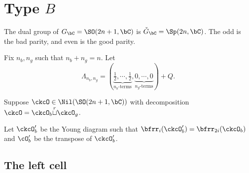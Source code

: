 \documentclass[12pt,a4paper]{amsart}
\newcommand{\sgn}{\operatorname{sgn}}
\numberwithin{equation}{section}
\theoremstyle{remark}
\def\half{{\tfrac{1}{2}}}
\def\ckGc{\check{G}_{\bC}}
\def\Gc{G_\bC}
\def\cuprow{{\stackrel{r}{\sqcup}}}
\def\tsgn{\widetilde{\sgn}}
\begin{document}






\section{Type $B$}

  The dual group of $\Gc = \SO(2n+1,\bC)$ is $\ckGc = \Sp(2n,\bC)$. The odd is
  the bad parity, and even is the good parity.


  Fix $n_{b},n_{g}$ such that $n_{b}+ n_{g} = n$. Let
  \begin{equation} \label{eq:Lam.C}
    \Lambda_{n_{b},n_{g}} = (\underbrace{\half, \cdots, \half}_{n_{b}\text{-terms}}, \underbrace{0, \cdots, 0}_{n_{g}\text{-terms}}) + Q.
  \end{equation}

  Suppose $\ckcO\in \Nil(\SO(2n+1,\bC))$ with decomposition
  $\ckcO = \ckcO_{b}\cuprow \ckcO_{g}$.

  Let $\ckcO'_b$ be the Young diagram such that
  $\bfrr_i(\ckcO'_b) = \bfrr_{2i}(\ckcO_b)$ and $\cO'_{b}$ be the transpose of
  $\ckcO'_{b}$.

  \subsection{The left cell}
\end{document}
